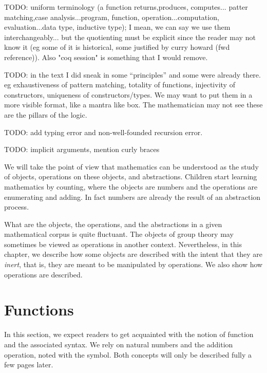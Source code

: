 \label{ch:prog}

TODO: uniform terminology (a function returns,produces, computes... patter matching,case analysis...program, function, operation...computation, evaluation...data type, inductive type); I mean, we can say we use them interchangeably... but the quotienting must be explicit since the reader may not know it (eg some of it is historical, some justified by curry howard (fwd reference)).  Also "coq session" is something that I would remove.

TODO: in the text I did sneak in some ``principles'' and some were already there.  eg exhaustiveness of pattern matching, totality of functions, injectivity of constructors, uniqueness of constructors/types.  We may want to put them in a more visible format, like a mantra like box.  The mathematician may not see these are the pillars of the logic.

TODO: add typing error and non-well-founded recursion error.

TODO: implicit arguments, mention curly braces


We will take the point of view that mathematics can be understood as
the study of objects, operations on these objects, and abstractions.  
Children start learning mathematics by counting, where the objects are
numbers and the operations are enumerating and adding.  In fact
numbers are already the result of an abstraction process.

What are the objects, the operations, and the abstractions in a given
mathematical corpus is quite fluctuant.  The objects of group theory
may sometimes be viewed as operations in another context.  Nevertheless,
in this chapter, we describe how some objects are described with the intent
that they are {\em inert}, that is, they are meant to be
manipulated by operations.  We also show how operations are described.

\section{Functions}
In this section, we expect readers to get acquainted with the notion
of function and the associated syntax.  We rely on natural
numbers and the addition operation, noted with the \C{+} symbol.
Both concepts will only be described fully a few pages later.

